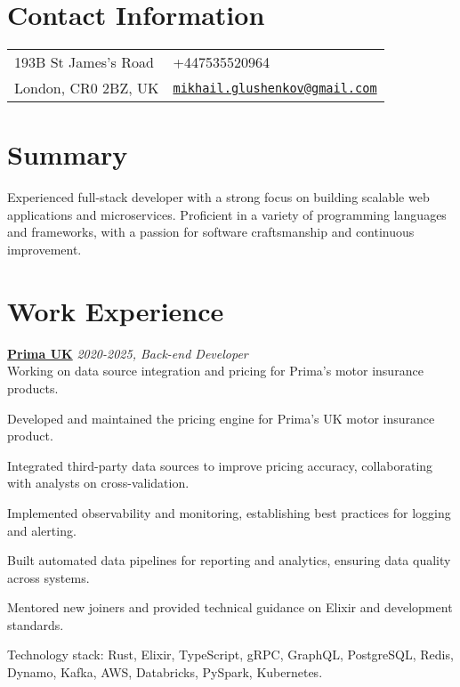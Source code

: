\documentclass[margin,line]{res}
\begin{document}

\begin{resume}
      \section{\sc Contact Information}
      \vspace{.05in}
      \begin{tabular}{@{}p{2in}p{4in}}
            193B St James's Road &
            +447535520964                           \\
            London, CR0 2BZ, UK  &
            \href{mailto:mikhail.glushenkov@gmail.com}
            {\texttt{mikhail.glushenkov@gmail.com}} \\
      \end{tabular}

      \section{\sc Summary} Experienced full-stack developer with a strong focus
      on building scalable web applications and microservices. Proficient in a
      variety of programming languages and frameworks, with a passion for
      software craftsmanship and continuous improvement.

      \section{\sc Work Experience}

       {\bf \href{https://helloprima.co.uk}{Prima UK}} \hfill {\it 2020-2025, Back-end Developer}\\
      Working on data source integration and pricing for Prima's motor insurance
      products.\\
      \begin{list}{}{\leftmargin=1.5em}
            \item Developed and maintained the pricing engine for Prima's UK motor insurance product.
            \item Integrated third-party data sources to improve pricing accuracy, collaborating with analysts on cross-validation.
            \item Implemented observability and monitoring, establishing best practices for logging and alerting.
            \item Built automated data pipelines for reporting and analytics, ensuring data quality across systems.
            \item Mentored new joiners and provided technical guidance on Elixir and development standards.
      \end{list}
      Technology stack: Rust, Elixir, TypeScript, gRPC, GraphQL, PostgreSQL, Redis, Dynamo, Kafka, AWS, Databricks, PySpark, Kubernetes.


\end{resume}
\end{document}
